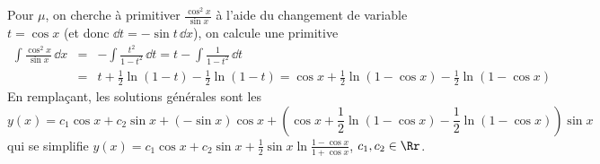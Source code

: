 {{Pour $\mu$, on cherche à primitiver 
$\frac{\cos^2x}{\sin x}$ à l'aide du changement de variable $t=\cos x$ (et donc $\dd t= -\sin t \,\dd x$), 
on calcule une primitive
\begin{eqnarray*}
\int \frac{\cos^2x}{\sin x}\,\dd x&=&-\int\frac{t^2}{1-t^2}\,\dd t=t-\int\frac{1}{1-t^2}\,\dd t\\ 
 &=&t+\frac{1}{2}\ln(1-t) -\frac{1}{2}\ln(1-t)= \cos x + \frac{1}{2}\ln(1-\cos x) - \frac{1}{2}\ln(1-\cos x)
\end{eqnarray*}
En remplaçant, les solutions générales sont les 
$$y(x)=c_1\cos x+c_2\sin x +  (-\sin x)\cos x+\left(\cos x + \frac{1}{2}\ln(1-\cos x) - \frac{1}{2}\ln(1-\cos x)\right)\sin x$$
qui se simplifie $y(x)=c_1\cos x+c_2\sin x + \frac{1}{2}\sin x\ln\frac{1-\cos x}{1+\cos x}$, $c_1,c_2\in\Rr$.}
}
